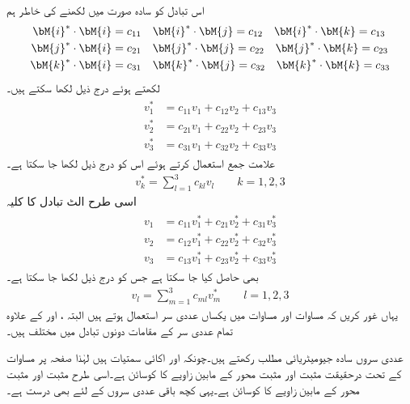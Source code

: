 اس تبادل کو سادہ صورت میں لکھنے کی خاطر ہم
\begin{gather}
\begin{aligned}\label{مساوات_الاحصاء_عددی_سر}
\bM{i}^*\cdot \bM{i}&=c_{11}\quad \bM{i}^*\cdot \bM{j}=c_{12} \quad \bM{i}^*\cdot \bM{k}=c_{13}\\
\bM{j}^*\cdot \bM{i}&=c_{21}\quad \bM{j}^*\cdot \bM{j}=c_{22} \quad \bM{j}^*\cdot \bM{k}=c_{23}\\
\bM{k}^*\cdot \bM{i}&=c_{31}\quad \bM{k}^*\cdot \bM{j}=c_{32} \quad \bM{k}^*\cdot \bM{k}=c_{33}
\end{aligned}
\end{gather} 
لکھتے ہوئے درج ذیل لکھا سکتے ہیں۔
\begin{gather}
\begin{aligned}\label{مساوات_الاحصاء_تبادل_نظام_الف}
v_1^*&=c_{11}v_1+c_{12}v_2+c_{13}v_3\\
v_2^*&=c_{21}v_1+c_{22}v_2+c_{23}v_3\\
v_3^*&=c_{31}v_1+c_{32}v_2+c_{33}v_3
\end{aligned}
\end{gather} 
علامت جمع استعمال کرتے ہوئے اس کو درج ذیل لکھا جا سکتا ہے۔
\begin{align}\label{مساوات_الاحصاء_تبادل_نظام_ب}
v_k^*=\sum_{l=1}^3 c_{kl} v_l \quad \quad k=1,2,3
\end{align} 
اسی طرح الٹ تبادل کا کلیہ
\begin{gather}
\begin{aligned}\label{مساوات_الاحصاء_تبادل_نظام_پ}
v_1&=c_{11}v_1^*+c_{21}v_2^*+c_{31}v_3^*\\
v_2&=c_{12}v_1^*+c_{22}v_2^*+c_{32}v_3^*\\
v_3&=c_{13}v_1^*+c_{23}v_2^*+c_{33}v_3^*
\end{aligned}
\end{gather} 
 بھی حاصل کیا جا سکتا ہے جس کو درج ذیل لکھا جا سکتا ہے۔
\begin{align}\label{مساوات_الاحصاء_تبادل_نظام_ت}
v_l=\sum_{m=1}^3 c_{ml} v_m^* \quad \quad l=1,2,3
\end{align}
یہاں غور کریں کہ مساوات  اور مساوات  میں یکساں عددی سر  استعمال ہوتے ہیں البتہ ،  اور  کے علاوہ تمام عددی سر کے مقامات دونوں تبادل میں مختلف ہیں۔

عددی سروں  سادہ جیومیٹریائی مطلب  رکھتے ہیں۔چونکہ  اور  اکائی سمتیات ہیں لہٰذا صفحہ  پر مساوات  کے تحت  درحقیقت مثبت  اور مثبت  محور کے مابین زاویے کا کوسائن  ہے۔اسی طرح  مثبت  اور مثبت  محور کے مابین زاویے کا کوسائن ہے۔یہی کچھ باقی عددی سروں کے لئے بھی درست ہے۔


